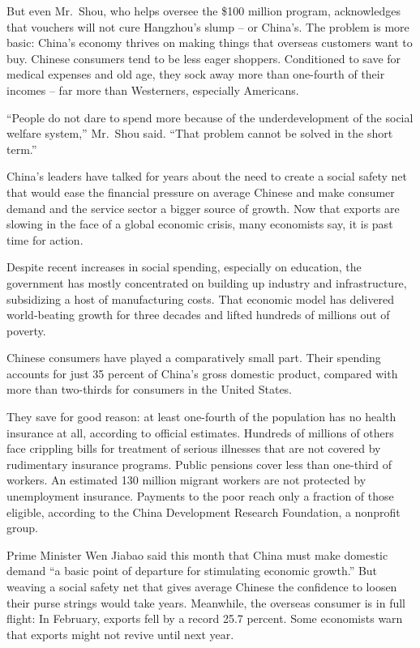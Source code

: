 \documentclass[12pt,a4paper,onecolumn]{article}
\begin{document}
\begin{CJK*}{GBK}{song}
But even Mr.~Shou, who helps oversee the \$100 million program, acknowledges that vouchers will not
cure Hangzhou's slump -- or China's. The problem is more basic: China's economy thrives on making
things that overseas customers want to buy. Chinese consumers tend to be less eager shoppers.
Conditioned to save for medical expenses and old age, they sock away more than one-fourth of their
incomes -- far more than Westerners, especially Americans.

``People do not dare to spend more because of the underdevelopment of the social welfare system,''
Mr.~Shou said. ``That problem cannot be solved in the short term.''

China's leaders have talked for years about the need to create a social safety net that would ease
the financial pressure on average Chinese and make consumer demand and the service sector a bigger
source of growth. Now that exports are slowing in the face of a global economic crisis, many
economists say, it is past time for action.

Despite recent increases in social spending, especially on education, the government has mostly
concentrated on building up industry and infrastructure, subsidizing a host of manufacturing costs.
That economic model has delivered world-beating growth for three decades and lifted hundreds of
millions out of poverty.

Chinese consumers have played a comparatively small part. Their spending accounts for just 35
percent of China's gross domestic product, compared with more than two-thirds for consumers in the
United States.

They save for good reason: at least one-fourth of the population has no health insurance at all,
according to official estimates. Hundreds of millions of others face crippling bills for treatment
of serious illnesses that are not covered by rudimentary insurance programs. Public pensions cover
less than one-third of workers. An estimated 130 million migrant workers are not protected by
unemployment insurance. Payments to the poor reach only a fraction of those eligible, according to
the China Development Research Foundation, a nonprofit group.

Prime Minister Wen Jiabao said this month that China must make domestic demand ``a basic point of
departure for stimulating economic growth.'' But weaving a social safety net that gives average
Chinese the confidence to loosen their purse strings would take years. Meanwhile, the overseas
consumer is in full flight: In February, exports fell by a record 25.7 percent. Some economists warn
that exports might not revive until next year.


\end{CJK*}
\end{document}
